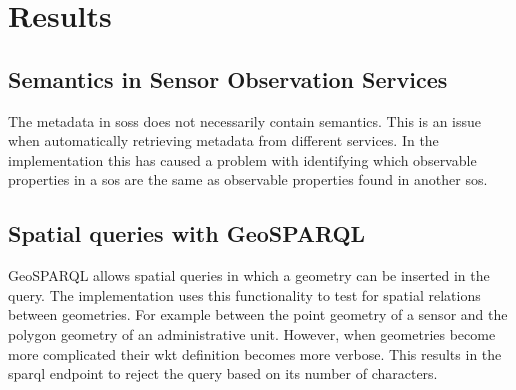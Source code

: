 
\chapter{Results}
\label{chap:results}

\section{Semantics in Sensor Observation Services}
The metadata in \aclp{sos} does not necessarily contain semantics. This is an issue when automatically retrieving metadata from different services. In the implementation this has caused a problem with identifying which observable properties in a \ac{sos} are the same as observable properties found in another \ac{sos}. 


\section{Spatial queries with GeoSPARQL}
GeoSPARQL allows spatial queries in which a geometry can be inserted in the query. The implementation uses this functionality to test for spatial relations between geometries. For example between the point geometry of a sensor and the polygon geometry of an administrative unit. However, when geometries become more complicated their \ac{wkt} definition becomes more verbose. This results in the \ac{sparql} endpoint to reject the query based on its number of characters.  

